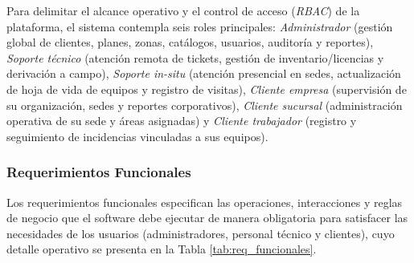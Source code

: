 Para delimitar el alcance operativo y el control de acceso (\textit{RBAC}) de la plataforma, el sistema contempla seis roles principales: \textit{Administrador} (gestión global de clientes, planes, zonas, catálogos, usuarios, auditoría y reportes), \textit{Soporte técnico} (atención remota de tickets, gestión de inventario/licencias y derivación a campo), \textit{Soporte in-situ} (atención presencial en sedes, actualización de hoja de vida de equipos y registro de visitas), \textit{Cliente empresa} (supervisión de su organización, sedes y reportes corporativos), \textit{Cliente sucursal} (administración operativa de su sede y áreas asignadas) y \textit{Cliente trabajador} (registro y seguimiento de incidencias vinculadas a sus equipos).

\subsubsection{Requerimientos Funcionales}
Los requerimientos funcionales especifican las operaciones, interacciones y reglas de negocio que el software debe ejecutar de manera obligatoria para satisfacer las necesidades de los usuarios (administradores, personal técnico y clientes), cuyo detalle operativo se presenta en la Tabla \ref{tab:req_funcionales}.

